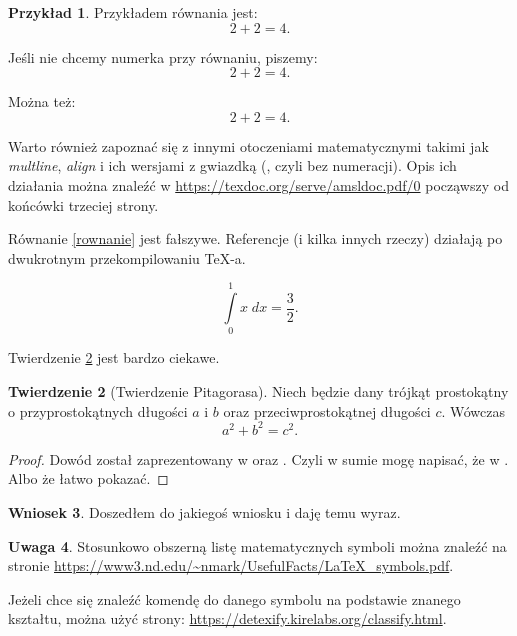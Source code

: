 \documentclass[a4paper,11pt,twoside]{report}
\theoremstyle{definition}
\newtheorem{theorem}{Twierdzenie}[chapter]
\newtheorem{example}[theorem]{Przykład}
\newtheorem{corollary}[theorem]{Wniosek}
\newtheorem{remark}[theorem]{Uwaga}
\begin{document}
\begin{example}
  Przykładem równania jest:
  \begin{equation}
    2+2=4.
  \end{equation}

  Jeśli nie chcemy numerka przy równaniu, piszemy:
  \begin{equation*}
    2+2=4.
  \end{equation*}

  Można też: %
  \[
    2+2=4.
  \]

  Warto również zapoznać się z innymi otoczeniami matematycznymi takimi jak \emph{multline}, \emph{align} i ich wersjami z gwiazdką (, czyli bez numeracji). Opis ich działania można znaleźć w \url{https://texdoc.org/serve/amsldoc.pdf/0} począwszy od końcówki trzeciej strony.


  Równanie \eqref{rownanie} jest fałszywe. Referencje (i kilka innych rzeczy) działają po dwukrotnym przekompilowaniu \TeX -a.

  \begin{equation}\label{rownanie}
    \int \limits_{0}^{1} x \; dx = \frac{3}{2}.
  \end{equation}

\end{example}

Twierdzenie \ref{Pitagoras} jest bardzo ciekawe.

\begin{theorem}[Twierdzenie Pitagorasa]\label{Pitagoras}
  Niech będzie dany trójkąt prostokątny o przyprostokątnych długości $a$ i $b$ oraz przeciwprostokątnej długości $c$. Wówczas
  \begin{equation*}
    a^2 + b^2 = c^2.
  \end{equation*}
\end{theorem}

\begin{proof}
  Dowód został zaprezentowany w \cite{Ktos} oraz \cite{Innyktos}. Czyli w sumie mogę napisać, że w \cite{Ktos, Innyktos}. Albo że łatwo pokazać.
\end{proof}

\begin{corollary}
  Doszedłem do jakiegoś wniosku i daję temu wyraz.
\end{corollary}




\begin{remark}
  Stosunkowo obszerną listę matematycznych symboli można znaleźć na stronie \url{https://www3.nd.edu/~nmark/UsefulFacts/LaTeX_symbols.pdf}.

  Jeżeli chce się znaleźć komendę do danego symbolu na podstawie znanego kształtu, można użyć strony: \url{https://detexify.kirelabs.org/classify.html}.
\end{remark}
\end{document}
